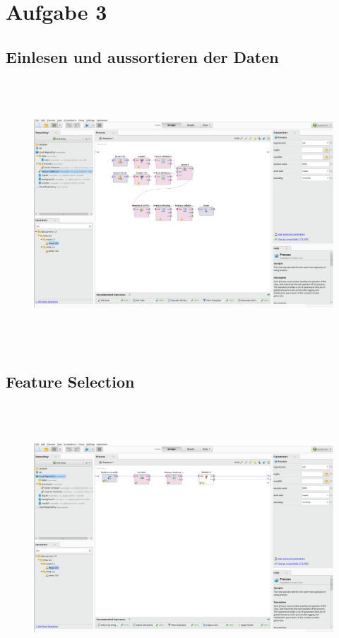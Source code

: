 




\section*{Aufgabe 3}
\subsection*{Einlesen und aussortieren der Daten}
\begin{figure}[H]
  \centering
  \includegraphics[height=10cm]{./Figures/Aufgabe3a.png}
\end{figure}
\subsection*{Feature Selection}
\begin{figure}[H]
  \centering
  \includegraphics[height=10cm]{./Figures/Aufgabe3b.png}
\end{figure}

